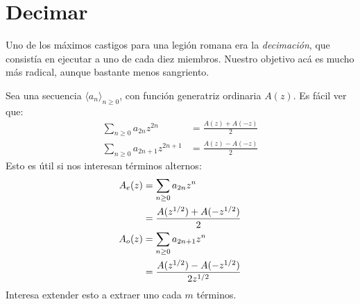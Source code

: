 \section{Decimar}
\label{sec:decimar}

  Uno de los máximos castigos para una legión romana era la \emph{decimación},
  que consistía en ejecutar a uno de cada diez miembros.
  Nuestro objetivo acá es mucho más radical,
  aunque bastante menos sangriento.

  Sea una secuencia \(\langle a_n \rangle_{n \ge 0}\),
  con función generatriz ordinaria \(A(z)\).
  Es fácil ver que:
  \begin{align}
    \sum_{n \ge 0} a_{2 n} z^{2 n}
      &= \frac{A(z) + A(-z)}{2}
	     \label{eq:a_even} \\
    \sum_{n \ge 0} a_{2 n + 1} z^{2 n + 1}
      &= \frac{A(z) - A(-z)}{2}
	     \label{eq:a_odd}
  \end{align}
  Esto es útil si nos interesan términos alternos:
  \begin{align}
    A_e(z)
      &= \sum_{n \ge 0} a_{2 n} z^n
	     \notag \\
      &= \frac{A(z^{1/2}) + A(-z^{1/2})}{2}
	     \label{eq:A_even} \\
    A_o(z)
      &= \sum_{n \ge 0} a_{2 n + 1} z^n
	      \notag \\
      &= \frac{A(z^{1/2}) - A(-z^{1/2})}{2 z^{1/2}}
	      \label{eq:A_odd}
  \end{align}
  Interesa extender esto a extraer uno cada \(m\) términos.

